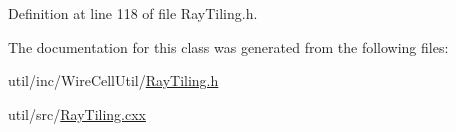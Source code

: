 Definition at line 118 of file Ray\+Tiling.\+h.



The documentation for this class was generated from the following files\+:\begin{DoxyCompactItemize}
\item 
util/inc/\+Wire\+Cell\+Util/\hyperlink{_ray_tiling_8h}{Ray\+Tiling.\+h}\item 
util/src/\hyperlink{_ray_tiling_8cxx}{Ray\+Tiling.\+cxx}\end{DoxyCompactItemize}
